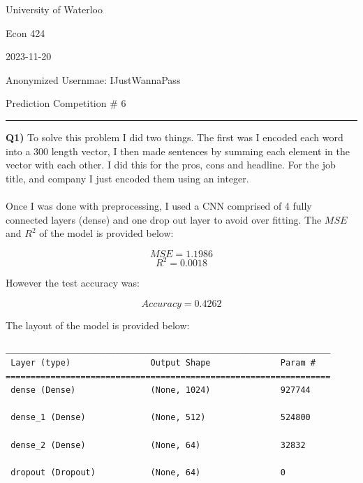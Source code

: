 \documentclass{article}
\begin{document}
\begin{titlepage}
	\setlength{\parindent}{0pt}
	\large

\vspace*{-2cm}

University of Waterloo \par
Econ 424 \par
2023-11-20 \par
\vspace{0.05cm}
Anonymized Usernmae: IJustWannaPass
\vspace{0.2cm}

{\huge Prediction Competition \# 6 \par}
\hrule

\vspace{1cm}
\textbf{Q1)} To solve this problem I did two things. The first was I encoded each word into a 300 length vector, I then made sentences by summing each element in the vector with each other. I did this for the pros, cons and headline. For the job title, and company I just encoded them using an integer. \\\\

Once I was done with preprocessing, I used a CNN comprised of 4 fully connected layers (dense) and one drop out layer to avoid over fitting. The $MSE$ and $R^2$ of the model is provided below:

\[ MSE = 1.1986 \]
\[ R^2 = 0.0018 \]

However the test accuracy was:

\[ Accuracy = 0.4262 \]

The layout of the model is provided below: \\
\begin{lstlisting}
_________________________________________________________________
 Layer (type)                Output Shape              Param #   
=================================================================
 dense (Dense)               (None, 1024)              927744    
                                                                 
 dense_1 (Dense)             (None, 512)               524800    
                                                                 
 dense_2 (Dense)             (None, 64)                32832     
                                                                 
 dropout (Dropout)           (None, 64)                0         
                                                                 

\end{lstlisting}
\end{titlepage}
\end{document}
